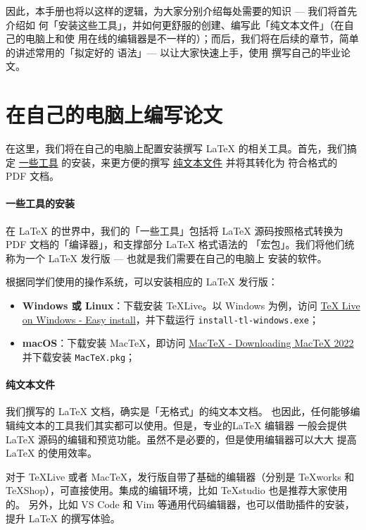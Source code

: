 因此，本手册也将以这样的逻辑，为大家分别介绍每处需要的知识 --- 我们将首先介绍如
何「安装这些工具」，并如何更舒服的创建、编写此「纯文本文件」（在自己的电脑上和使
用在线的编辑器是不一样的）；而后，我们将在后续的章节，简单的讲述常用的「拟定好的
语法」--- 以让大家快速上手，使用 \BIThesis{} 撰写自己的毕业论文。

\section{在自己的电脑上编写论文}

在这里，我们将在自己的电脑上配置安装撰写 \LaTeX{} 的相关工具。首先，我们搞定
\underline{一些工具} 的安装，来更方便的撰写 \underline{纯文本文件} 并将其转化为
符合格式的 PDF 文档。

\paragraph{一些工具的安装} 在 \LaTeX{} 的世界中，我们的「一些工具」包括将
\LaTeX{} 源码按照格式转换为 PDF 文档的「编译器」，和支撑部分 \LaTeX{} 格式语法的
「宏包」。我们将他们统称为一个 \LaTeX{} 发行版 --- 也就是我们需要在自己的电脑上
安装的软件。

根据同学们使用的操作系统，可以安装相应的 \LaTeX{} 发行版：

\begin{itemize}[noitemsep]
  \item \textbf{Windows 或 Linux}：下载安装 \TeX{}Live。以 Windows 为例，访问
  \href{https://www.tug.org/texlive/windows.html}{TeX Live on Windows - Easy
  install}，并下载运行 \texttt{install-tl-windows.exe}；
  \item \textbf{macOS}：下载安装 Mac\TeX{}，即访问
  \href{https://www.tug.org/mactex/mactex-download.html}{MacTeX - Downloading
  MacTeX 2022} 并下载安装 \texttt{MacTeX.pkg}；
\end{itemize}

\paragraph{纯文本文件} 我们撰写的 \LaTeX{} 文档，确实是「无格式」的纯文本文档。
也因此，任何能够编辑纯文本的工具我们其实都可以使用。但是，专业的\LaTeX{} 编辑器
一般会提供 \LaTeX{} 源码的编辑和预览功能。虽然不是必要的，但是使用编辑器可以大大
提高\LaTeX{} 的使用效率。

对于 \TeX{}Live 或者 Mac\TeX，发行版自带了基础的编辑器（分别是 \TeX{}works 和
\TeX{}Shop），可直接使用。集成的编辑环境，比如 \TeX{}studio 也是推荐大家使用的。
另外，比如 VS Code 和 Vim 等通用代码编辑器，也可以借助插件的安装，提升 \LaTeX{}
的撰写体验。

